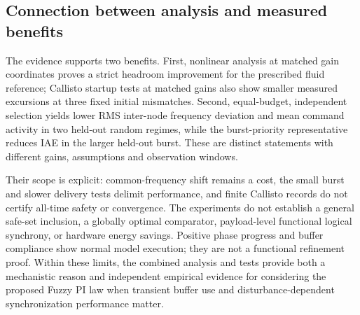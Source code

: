 \subsection{Connection between analysis and measured benefits}
\label{detail:subsec:eval_support}

The evidence supports two benefits. First, nonlinear analysis at
matched gain coordinates proves a strict headroom improvement for the
prescribed fluid reference; Callisto startup tests at matched gains also show
smaller measured excursions at three fixed initial mismatches. Second,
equal-budget, independent selection yields lower RMS inter-node frequency deviation and
mean command activity in two held-out random regimes, while the
burst-priority representative reduces IAE in the larger held-out burst.
These are distinct statements with different gains, assumptions and
observation windows.

Their scope is explicit: common-frequency shift remains a cost, the
small burst and slower delivery tests delimit performance, and finite
Callisto records do not certify all-time safety or convergence. The
experiments do not establish a general safe-set inclusion, a globally
optimal comparator, payload-level functional logical synchrony, or
hardware energy savings. Positive phase progress and buffer compliance
show normal model execution; they are not a functional refinement proof.
Within these limits, the combined analysis and tests provide both a
mechanistic reason and independent empirical evidence for considering
the proposed Fuzzy PI law when transient buffer use and
disturbance-dependent synchronization performance matter.



